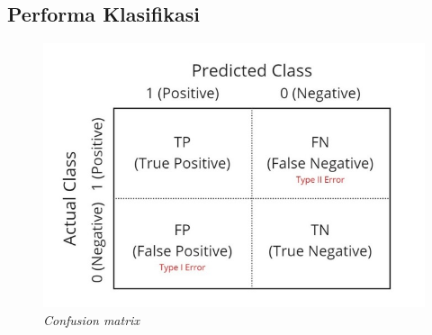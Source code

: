 
\subsection{Performa Klasifikasi}

\begin{figure}[H]
    \centering

    \includegraphics[scale=0.8]{gambar/bab2-confusion-matrix.png}
 
    \caption{\textit{Confusion matrix}}
    \label{fig:confusionMatrix}
\end{figure}

